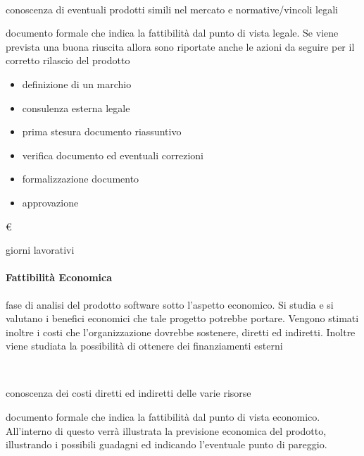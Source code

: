 \item[Responsabile:] \\

\item[Input:] conoscenza di eventuali prodotti simili nel mercato e normative/vincoli legali\\

\item[Output:] documento formale che indica la fattibilità dal punto di vista legale. Se viene
prevista una buona riuscita allora sono riportate anche le azioni da seguire per il corretto
rilascio del prodotto\\

\item[Attività:]
\begin{itemize}
\item definizione di un marchio
\item consulenza esterna legale
\item prima stesura documento riassuntivo
\item verifica documento ed eventuali correzioni
\item formalizzazione documento
\item approvazione
\end{itemize}
\item[Costo:] \euro \\
\item[Tempi di realizzazione:]  giorni lavorativi


\paragraph{Fattibilità Economica}

\item[Descrizione:] fase di analisi del prodotto software sotto l'aspetto economico. Si studia
e si valutano i benefici economici che tale progetto potrebbe portare. Vengono stimati
inoltre i costi che l'organizzazione dovrebbe sostenere, diretti ed indiretti. Inoltre viene
studiata la possibilità di ottenere dei finanziamenti esterni \\

\item[Responsabile:] \\

\item[Input:] conoscenza dei costi diretti ed indiretti delle varie risorse \\

\item[Output:] documento formale che indica la fattibilità dal punto di vista economico.
All'interno di questo verrà illustrata la previsione economica del prodotto, illustrando i
possibili guadagni ed indicando l'eventuale punto di pareggio.\\

